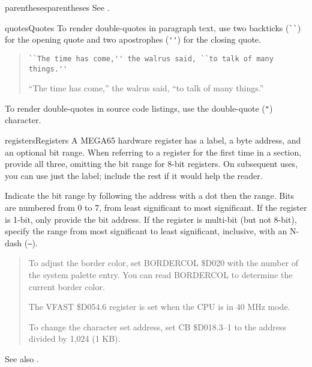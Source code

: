 \begin{sgentry}{parentheses}{parentheses}
    See .
\end{sgentry}

\begin{sgentry}{quotes}{Quotes}
    To render double-quotes in paragraph text, use two backticks (\verb|``|) for the opening quote and two apostrophes (\verb|''|) for the closing quote.

    \begin{quote}
        \begin{verbatim}
``The time has come,'' the walrus said, ``to talk of many things.''
        \end{verbatim}

        \hrulefill

        ``The time has come,'' the walrus said, ``to talk of many things.''
    \end{quote}

    To render double-quotes in source code listings, use the double-quote (\verb|"|) character.
\end{sgentry}

\begin{sgentry}{registers}{Registers}
    A MEGA65 hardware register has a label, a byte address, and an optional bit range. When referring to a register for the first time in a section, provide all three, omitting the bit range for 8-bit registers. On subsequent uses, you can use just the label; include the rest if it would help the reader.

    Indicate the bit range by following the address with a dot then the range. Bits are numbered from 0 to 7, from least significant to most significant. If the register is 1-bit, only provide the bit address. If the register is multi-bit (but not 8-bit), specify the range from most significant to least significant, inclusive, with an N-dash (\texttt{--}).

    \begin{quote}
        To adjust the border color, set BORDERCOL \$D020 with the number of the system palette entry. You can read BORDERCOL to determine the current border color.

        The VFAST \$D054.6 register is set when the CPU is in 40 MHz mode.

        To change the character set address, set CB \$D018.3--1 to the address divided by 1,024 (1 KB).
    \end{quote}

    See also .
\end{sgentry}


